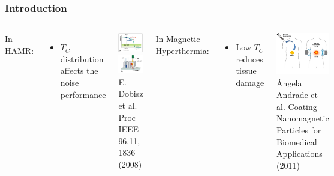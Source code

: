 \documentclass{beamer}
\begin{document}
\begin{frame}
	\frametitle{Introduction}
	\begin{columns}
		\column{6cm}
		In HAMR\footnotemark[1]:
		\begin{itemize}
			\item{$T_C$ distribution affects the noise performance}
		\end{itemize} \vspace{5mm}
		
		\begin{center}
		\includegraphics[width=2.9cm]{Images/coerc} \hspace{1mm}
		\includegraphics[width=2.9cm]{Images/laser} \\
		\tiny E. Dobisz et al. Proc IEEE 96.11, 1836 (2008)
		\end{center}
		
		\column{6cm}
		In Magnetic Hyperthermia\footnotemark[2]:
		\begin{itemize}
		\item{Low $T_C$ reduces tissue damage}
		\end{itemize}
		
		\begin{center}
		\includegraphics[width=4cm]{Images/person} \\
		\tiny \^{A}ngela Andrade et al. Coating Nanomagnetic Particles for Biomedical Applications (2011)
		\end{center}
	\end{columns}
\end{frame}
\end{document}
